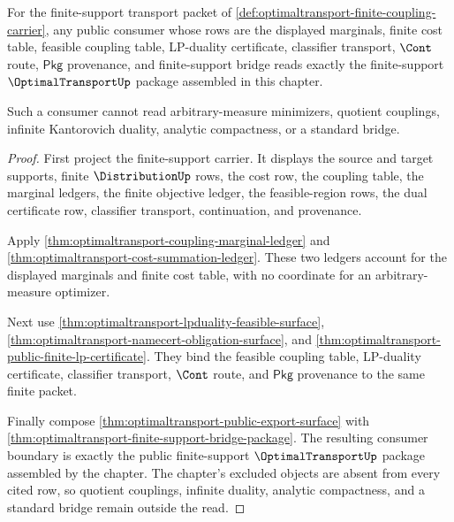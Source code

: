 \begin{theorem}
\label{thm:optimaltransport-mature-consumer-boundary}
For the finite-support transport packet of
\autoref{def:optimaltransport-finite-coupling-carrier}, any public consumer
whose rows are the displayed marginals, finite cost table, feasible coupling
table, LP-duality certificate, classifier transport, $\Cont$ route,
$\mathsf{Pkg}$ provenance, and finite-support bridge reads exactly the
finite-support $\OptimalTransportUp$ package assembled in this chapter.

Such a consumer cannot read arbitrary-measure minimizers, quotient couplings,
infinite Kantorovich duality, analytic compactness, or a standard bridge.
\end{theorem}
\begin{proof}
First project the finite-support carrier. It displays the source and target
supports, finite $\DistributionUp$ rows, the cost row, the coupling table, the
marginal ledgers, the finite objective ledger, the feasible-region rows, the
dual certificate row, classifier transport, continuation, and provenance.

Apply \autoref{thm:optimaltransport-coupling-marginal-ledger} and
\autoref{thm:optimaltransport-cost-summation-ledger}. These two ledgers account
for the displayed marginals and finite cost table, with no coordinate for an
arbitrary-measure optimizer.

Next use \autoref{thm:optimaltransport-lpduality-feasible-surface},
\autoref{thm:optimaltransport-namecert-obligation-surface}, and
\autoref{thm:optimaltransport-public-finite-lp-certificate}. They bind the
feasible coupling table, LP-duality certificate, classifier transport, $\Cont$
route, and $\mathsf{Pkg}$ provenance to the same finite packet.

Finally compose \autoref{thm:optimaltransport-public-export-surface} with
\autoref{thm:optimaltransport-finite-support-bridge-package}. The resulting
consumer boundary is exactly the public finite-support $\OptimalTransportUp$
package assembled by the chapter. The chapter's excluded objects are absent
from every cited row, so quotient couplings, infinite duality, analytic
compactness, and a standard bridge remain outside the read.
\end{proof}

